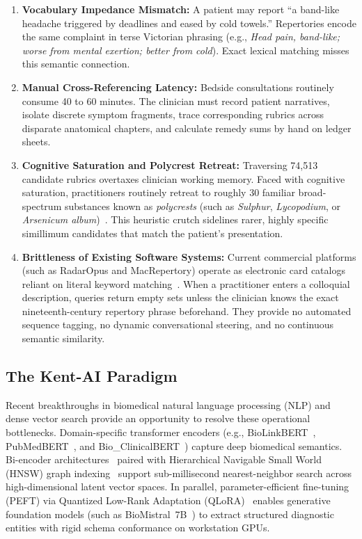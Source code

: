 \begin{enumerate}
    \item \textbf{Vocabulary Impedance Mismatch:} A patient may report ``a band-like headache triggered by deadlines and eased by cold towels.'' Repertories encode the same complaint in terse Victorian phrasing (e.g., \textit{Head pain, band-like; worse from mental exertion; better from cold}). Exact lexical matching misses this semantic connection.
    \item \textbf{Manual Cross-Referencing Latency:} Bedside consultations routinely consume 40 to 60 minutes. The clinician must record patient narratives, isolate discrete symptom fragments, trace corresponding rubrics across disparate anatomical chapters, and calculate remedy sums by hand on ledger sheets.
    \item \textbf{Cognitive Saturation and Polycrest Retreat:} Traversing 74,513 candidate rubrics overtaxes clinician working memory. Faced with cognitive saturation, practitioners routinely retreat to roughly 30 familiar broad-spectrum substances known as \textit{polycrests} (such as \textit{Sulphur}, \textit{Lycopodium}, or \textit{Arsenicum album})~\cite{sherr2002}. This heuristic crutch sidelines rarer, highly specific simillimum candidates that match the patient's presentation.
    \item \textbf{Brittleness of Existing Software Systems:} Current commercial platforms (such as RadarOpus and MacRepertory) operate as electronic card catalogs reliant on literal keyword matching~\cite{radaropus2024}. When a practitioner enters a colloquial description, queries return empty sets unless the clinician knows the exact nineteenth-century repertory phrase beforehand. They provide no automated sequence tagging, no dynamic conversational steering, and no continuous semantic similarity.
\end{enumerate}

\subsection{The Kent-AI Paradigm}

Recent breakthroughs in biomedical natural language processing (NLP) and dense vector search provide an opportunity to resolve these operational bottlenecks. Domain-specific transformer encoders (e.g., BioLinkBERT~\cite{yasunaga2022linkbert}, PubMedBERT~\cite{gu2021domain}, and Bio\_ClinicalBERT~\cite{alsentzer2019publicly}) capture deep biomedical semantics. Bi-encoder architectures~\cite{reimers2019sentence} paired with Hierarchical Navigable Small World (HNSW) graph indexing~\cite{malkov2018efficient} support sub-millisecond nearest-neighbor search across high-dimensional latent vector spaces. In parallel, parameter-efficient fine-tuning (PEFT) via Quantized Low-Rank Adaptation (QLoRA)~\cite{dettmers2023qlora} enables generative foundation models (such as BioMistral~7B~\cite{labrak2024biomistral}) to extract structured diagnostic entities with rigid schema conformance on workstation GPUs.

